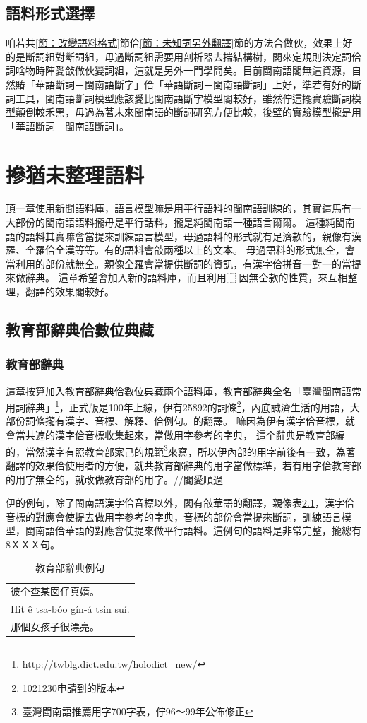 \documentclass[final,oneside,onecolumn,12pt,a4paper]{book}%
\begin{document}
\section{語料形式選擇}
\label{節：語料形式選擇}
咱若共\ref{節：改變語料格式}節佮\ref{節：未知詞另外翻譯}節的方法合做伙，效果上好的是斷詞組對斷詞組，毋過斷詞組需要用剖析器去揣結構樹，閣來定規則決定詞佮詞啥物時陣愛敆做伙變詞組，這就是另外一門學問矣。目前閩南語閣無這資源，自然賰「華語斷詞－閩南語斷字」佮「華語斷詞－閩南語斷詞」上好，準若有好的斷詞工具，閩南語斷詞模型應該愛比閩南語斷字模型閣較好，雖然佇這擺實驗斷詞模型顛倒較禾黑，毋過為著未來閩南語的斷詞研究方便比較，後壁的實驗模型攏是用「華語斷詞－閩南語斷詞」。

\chapter{摻猶未整理語料}
\label{章：摻猶未整理語料}
頂一章使用新聞語料庫，語言模型嘛是用平行語料的閩南語訓練的，其實這馬有一大部份的閩南語語料攏毋是平行話料，攏是純閩南語一種語言爾爾。
這種純閩南語的語料其實嘛會當提來訓練語言模型，毋過語料的形式就有足濟款的，親像有漢羅、全羅佮全漢等等。有的語料會敆兩種以上的文本。
毋過語料的形式無仝，會當利用的部份就無仝。親像全羅會當提供斷詞的資訊，有漢字佮拼音一對一的當提來做辭典。
這章希望會加入新的語料庫，而且利用⿰因無仝款的性質，來互相整理，翻譯的效果閣較好。


\section{教育部辭典佮數位典藏}
\label{節：教育部語料佮數位典藏}
\subsection{教育部辭典}
\label{節：教育部辭典}
這章按算加入教育部辭典佮數位典藏兩个語料庫，教育部辭典全名「臺灣閩南語常用詞辭典」\footnote{\url{http://twblg.dict.edu.tw/holodict_new/}}，正式版是100年上線，伊有25892的詞條\footnote{1021230申請到的版本}，內底誠濟生活的用語，大部份詞條攏有漢字、音標、解釋、佮例句。的翻譯。
嘛因為伊有漢字佮音標，就會當共遮的漢字佮音標收集起來，當做用字參考的字典，
這个辭典是教育部編的，當然漢字有照教育部家己的規範\footnote{臺灣閩南語推薦用字700字表，佇96～99年公佈修正}來寫，所以伊內部的用字前後有一致，為著翻譯的效果佮使用者的方便，就共教育部辭典的用字當做標準，若有用字佮教育部的用字無仝的，就改做教育部的用字。//閣愛順過

伊的例句，除了閩南語漢字佮音標以外，閣有敆華語的翻譯，親像表\ref{表：教育部辭典例句}，漢字佮音標的對應會使提去做用字參考的字典，音標的部份會當提來斷詞，訓練語言模型，閩南語佮華語的對應會使提來做平行語料。這例句的語料是非常完整，攏總有8ＸＸＸ句。
\begin{table}
\caption{教育部辭典例句}
\label{表：教育部辭典例句}
\centering
\begin{tabular}{l}
彼个查某囡仔真媠。 \\
Hit ê tsa-bóo gín-á tsin suí.\\
那個女孩子很漂亮。\\
\end{tabular}
\end{table}
\end{document}
